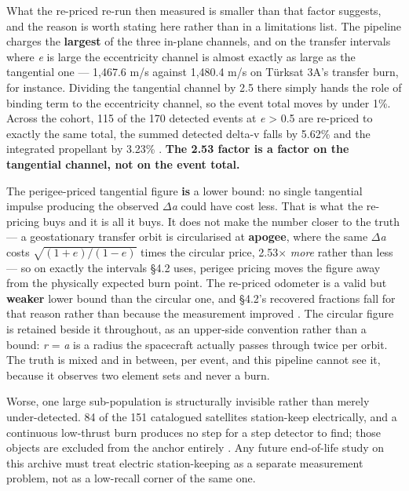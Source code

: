 \documentclass[11pt]{article}
\begin{document}
What the re-priced re-run then measured is smaller than that factor suggests, and the reason is worth stating here rather than in a limitations list. The pipeline charges the \textbf{largest} of the three in-plane channels, and on the transfer intervals where \emph{e} is large the eccentricity channel is almost exactly as large as the tangential one --- 1,467.6 m/s against 1,480.4 m/s on T\"urksat 3A's transfer burn, for instance. Dividing the tangential channel by 2.5 there simply hands the role of binding term to the eccentricity channel, so the event total moves by under 1\%. Across the cohort, 115 of the 170 detected events at \emph{e} > 0.5 are re-priced to exactly the same total, the summed detected delta-v falls by 5.62\% and the integrated propellant by 3.23\%%
. \textbf{The 2.53 factor is a factor on the tangential channel, not on the event total.}

The perigee-priced tangential figure \textbf{is} a lower bound: no single tangential impulse producing the observed $\Delta$\emph{a} could have cost less. That is what the re-pricing buys and it is all it buys. It does not make the number closer to the truth --- a geostationary transfer orbit is circularised at \textbf{apogee}, where the same $\Delta$\emph{a} costs $\sqrt{(1+e)/(1-e)}$ times the circular price, 2.53$\times$ \emph{more} rather than less --- so on exactly the intervals \S{}4.2 uses, perigee pricing moves the figure away from the physically expected burn point. The re-priced odometer is a valid but \textbf{weaker} lower bound than the circular one, and \S{}4.2's recovered fractions fall for that reason rather than because the measurement improved%
. The circular figure is retained beside it throughout, as an upper-side convention rather than a bound: \emph{r} = \emph{a} is a radius the spacecraft actually passes through twice per orbit. The truth is mixed and in between, per event, and this pipeline cannot see it, because it observes two element sets and never a burn.

Worse, one large sub-population is structurally invisible rather than merely under-detected. 84 of the 151 catalogued satellites station-keep electrically, and a continuous low-thrust burn produces no step for a step detector to find; those objects are excluded from the anchor entirely%
. Any future end-of-life study on this archive must treat electric station-keeping as a separate measurement problem, not as a low-recall corner of the same one.
\end{document}
